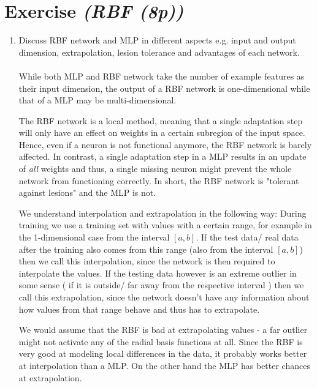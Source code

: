 \documentclass{article}
\begin{document}
\section{Exercise \textit{(RBF (8p))}}
\begin{enumerate}
    \item Discuss RBF network and MLP in different aspects e.g. input and output
        dimension, extrapolation, lesion tolerance and advantages of each
        network.\\
        \\
        While both MLP and RBF network take the number of example features as
        their input dimension, the output of a RBF network is one-dimensional
        while that of a MLP may be multi-dimensional.

        The RBF network is a local method, meaning that a single adaptation step
        will only have an effect on weights in a certain subregion of the input
        space. Hence, even if a neuron is not functional anymore, the RBF
        network is barely affected. In contrast, a single adaptation step in a
        MLP results in an update of \textit{all} weights and thus, a single
        missing neuron might prevent the whole network from functioning
        correctly.  In short, the RBF network is "tolerant against lesions" and
        the MLP is not.
        
        We understand interpolation and extrapolation in the following way: During training we use a training set with values with a certain range, for example in the 1-dimensional case from the interval $[a,b]$. If the test data/ real data after the training also comes from this range (also from the interval $[a,b]$) then we call this interpolation, since the network is then required to interpolate the values. If the testing data however is an extreme outlier in some sense ( if it is outside/ far away from the respective interval ) then we call this extrapolation, since the network doesn't have any information about how values from that range behave and thus has to extrapolate.
        
        We would assume that the RBF is bad at extrapolating values - a far outlier might not activate any of the radial basis functions at all. Since the RBF is very good at modeling local differences in the data, it probably works better at interpolation than a MLP. On the other hand the MLP has better chances at extrapolation.


\end{enumerate}
\end{document}
